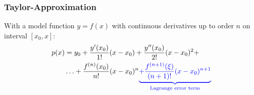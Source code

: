 \subsubsection{Taylor-Approximation}

With a model function $y=f(x)$ with continuous derivatives up to order $n$ on interval $[x_0,x]$:
\begin{align*}
	p(x) & = y_0 + \frac{y'(x_0)}{1!}(x-x_0) + \frac{y''(x_0)}{2!}(x-x_0)^2 + \\
	\ & \ldots + \frac{f^{(n)}(x_0)}{n!}(x-x_0)^n {\color{blue} \underbrace{+ \frac{f^{(n+1)}(\xi)}{(n+1)!}(x-x_0)^{n+1}}_{\text{Lagrange error term}}}
\end{align*}


